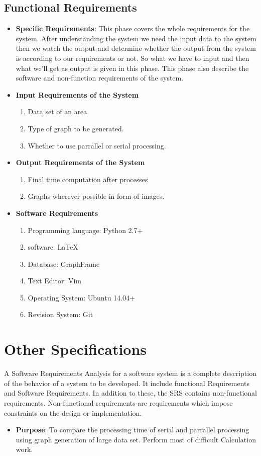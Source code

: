 \subsection{Functional Requirements}
\begin{itemize}
\item {\bf Specific Requirements}: This phase covers the whole requirements 
for the system. After understanding the system we need the input data 
to the system then we watch the output and determine whether the output 
from the system is according to our requirements or not. So what we have 
to input and then what we'll get as output is given in this phase. This 
phase also describe the software and non-function requirements of the 
system.
\item {\bf Input Requirements of the System}
\begin{enumerate} 
\item Data set of an area.
\item Type of graph to be generated.
\item Whether to use parrallel or serial processing.
\end{enumerate}
\vskip 0.5cm
\item {\bf Output Requirements of the System}
\begin{enumerate} 
\item Final time computation after processes
\item Graphs wherever possible in form of images. 
\end{enumerate}
\vskip 0.5cm
\item {\bf Software Requirements}
\begin{enumerate} 
\item Programming language: Python 2.7+
\item software: \LaTeX{}
\item Database: GraphFrame 
\item Text Editor: Vim
\item Operating System: Ubuntu 14.04+
\item Revision System: Git
\end{enumerate}
\end{itemize}

\section{Other Specifications}

A Software Requirements Analysis for a software system is a complete 
description of the behavior of a system to be developed. It include functional Requirements
and Software Requirements. In addition to these, the SRS contains 
non-functional requirements. Non-functional requirements are 
requirements which impose constraints on the design or implementation.
\begin{itemize}
\item{\bf Purpose}: To compare the processing time of serial and parrallel processing using graph generation of large data set.
Perform most of difficult Calculation work.
\end{itemize}


